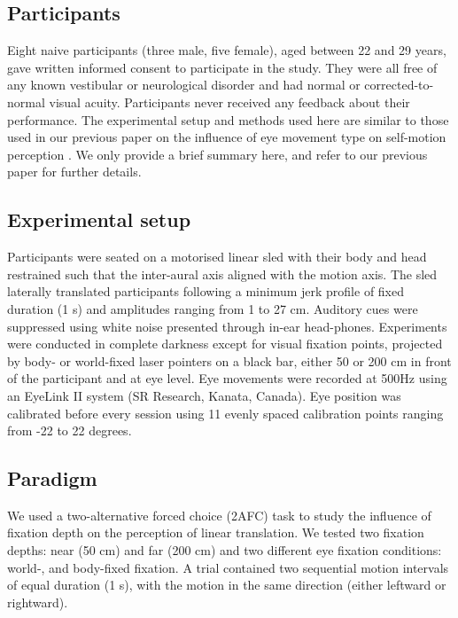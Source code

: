 \subsection{Participants}

Eight naive participants (three male, five female), aged between 22 and 29 years, gave written informed consent to participate in the study. They were all free of any known vestibular or neurological disorder and had normal or corrected-to-normal visual acuity. Participants never received any feedback about their performance.  The experimental setup and methods used here are similar to those used in our previous paper on the influence of eye movement type on self-motion perception \cite{clemens2015a}. We only provide a brief summary here, and refer to our previous paper for further details.

\subsection{Experimental setup}

Participants were seated on a motorised linear sled with their body and head restrained such that the inter-aural axis aligned with the motion axis. The sled laterally translated participants following a minimum jerk profile of fixed duration (1 \si{\second}) and amplitudes ranging from 1 to 27 \si{\centi\metre}. Auditory cues were suppressed using white noise presented through in-ear head-phones. Experiments were conducted in complete darkness except for visual fixation points, projected by body- or world-fixed laser pointers on a black bar, either 50 or 200 \si{\centi\metre} in front of the participant and at eye level. Eye movements were recorded at 500Hz using an EyeLink II system (SR Research, Kanata, Canada). Eye position was calibrated before every session using 11 evenly spaced calibration points ranging from -22 to 22 degrees.


\subsection{Paradigm}

We used a two-alternative forced choice (2AFC) task to study the influence of fixation depth on the perception of linear translation. We tested two fixation depths: near (50 \si{\centi\metre}) and far (200 \si{\centi\metre}) and two different eye fixation conditions: world-, and body-fixed fixation. A trial contained two sequential motion intervals of equal duration (1 \si{\second}), with the motion in the same direction (either leftward or rightward).

